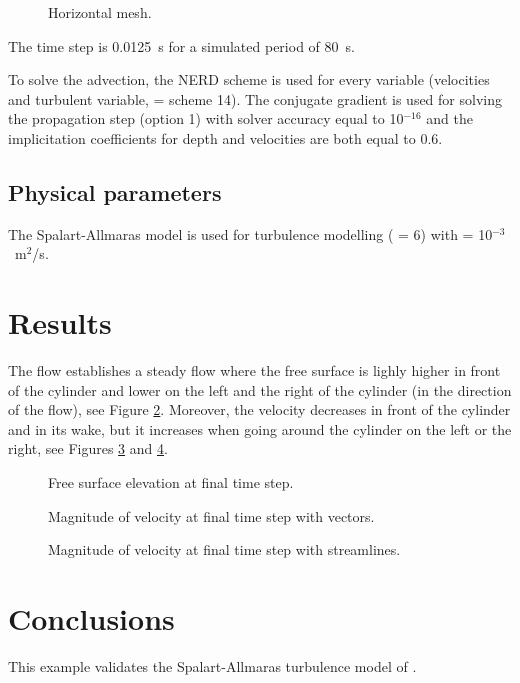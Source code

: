 \begin{figure}[!htbp]
 \centering
 \caption{Horizontal mesh.}
 \label{t2d:Negretti2D:fig:meshH}
\end{figure}

The time step is 0.0125~s for a simulated period of 80~s.

To solve the advection, the NERD scheme is used for every variable
(velocities and turbulent variable, = scheme 14).
The conjugate gradient
is used for solving the propagation step (option 1)
with solver accuracy equal to 10$^{-16}$ and
the implicitation coefficients
for depth and velocities are both equal to 0.6.

\subsection{Physical parameters}

The Spalart-Allmaras model is used for turbulence modelling
( = 6)
with  = 10$^{-3}$~m$^2$/s.

\section{Results}

The flow establishes a steady flow where the free surface is lighly higher
in front of the cylinder and lower on the left and the right of the cylinder (in the direction of the flow), see Figure \ref{t2d:Negretti2D:freesurf}.
Moreover, the velocity decreases in front of the cylinder and in its wake, but it increases when going around the cylinder on the left or the right,
see Figures \ref{t2d:Negretti2D:velovect} and \ref{t2d:Negretti2D:velostream}.

\begin{figure}[H]
\centering
{}
\caption{Free surface elevation at final time step.}
\label{t2d:Negretti2D:freesurf}
\end{figure}

\begin{figure}[H]
\centering
{}
\caption{Magnitude of velocity at final time step with vectors.}
\label{t2d:Negretti2D:velovect}
\end{figure}

\begin{figure}[H]
\centering
{}
\caption{Magnitude of velocity at final time step with streamlines.}
\label{t2d:Negretti2D:velostream}
\end{figure}

\section{Conclusions}

This example validates the Spalart-Allmaras turbulence model of .
